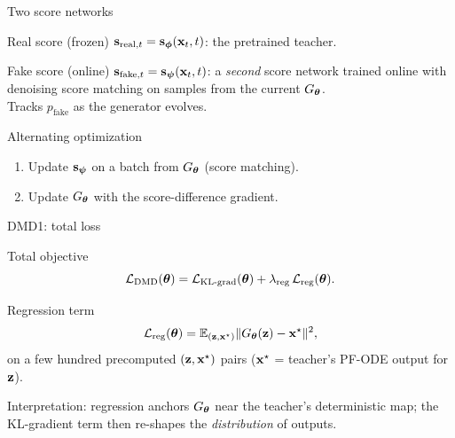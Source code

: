 \documentclass{beamer}
\begin{document}
\begin{frame}{Two score networks}
	\begin{block}{Real score (frozen)}
		$\mathbf{s}_{\text{real}, t} = \mathbf{s}_{\boldsymbol{\phi}}(\mathbf{x}_t, t)$: the pretrained teacher.
	\end{block}
	\eqpause
	\begin{block}{Fake score (online)}
		$\mathbf{s}_{\text{fake}, t} = \mathbf{s}_{\boldsymbol{\psi}}(\mathbf{x}_t, t)$: a \emph{second} score network trained online with denoising score matching on samples from the current $G_{\boldsymbol{\theta}}$.
		\\
		Tracks $p_{\text{fake}}$ as the generator evolves.
	\end{block}
	\eqpause
	\begin{block}{Alternating optimization}
		\begin{enumerate}
			\item Update $\mathbf{s}_{\boldsymbol{\psi}}$ on a batch from $G_{\boldsymbol{\theta}}$ (score matching).
			\item Update $G_{\boldsymbol{\theta}}$ with the score-difference gradient.
		\end{enumerate}
	\end{block}
\end{frame}
\begin{frame}{DMD1: total loss}
	\begin{block}{Total objective}
		\vspace{-0.3cm}
		\[
			\mathcal{L}_{\text{DMD}}(\boldsymbol{\theta}) = \mathcal{L}_{\text{KL-grad}}(\boldsymbol{\theta}) + \lambda_{\text{reg}}\, \mathcal{L}_{\text{reg}}(\boldsymbol{\theta}).
		\]
	\end{block}
	\eqpause
	\begin{block}{Regression term}
		\vspace{-0.3cm}
		\[
			\mathcal{L}_{\text{reg}}(\boldsymbol{\theta}) = \mathbb{E}_{(\mathbf{z}, \mathbf{x}^\star)} \| G_{\boldsymbol{\theta}}(\mathbf{z}) - \mathbf{x}^\star \|^2,
		\]
		on a few hundred precomputed $(\mathbf{z}, \mathbf{x}^\star)$ pairs ($\mathbf{x}^\star$ = teacher's PF-ODE output for $\mathbf{z}$).
	\end{block}
	\eqpause
	Interpretation: regression anchors $G_{\boldsymbol{\theta}}$ near the teacher's deterministic map; the KL-gradient term then re-shapes the \emph{distribution} of outputs.
\end{frame}
\end{document}
